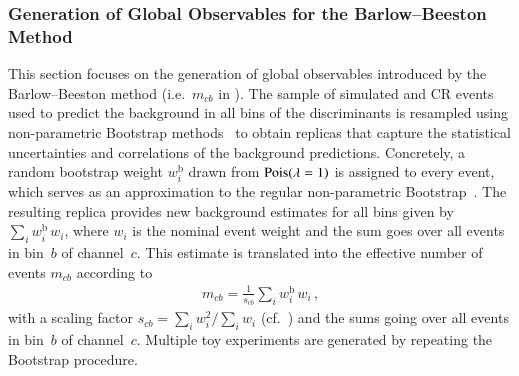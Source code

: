 \subsubsection{Generation of Global Observables for the Barlow--Beeston Method}

This section focuses on the generation of global observables introduced by the
Barlow--Beeston method (i.e.~$m_{cb}$ in
).
%
%
%
The sample of simulated and CR events used to predict the background in all bins
of the discriminants is resampled using non-parametric Bootstrap
methods~\cite{10.1214/aos/1176344552,efron1994introduction} to obtain replicas
that capture the statistical uncertainties and correlations of the background
predictions. Concretely, a random bootstrap weight $w_i^{\text{b}}$ drawn from
$\operatorname{Pois}(\lambda = 1)$ is assigned to every event, which serves as an
approximation to the regular non-parametric
Bootstrap~\cite{google:poisson,ATL-PHYS-PUB-2021-011}. The resulting replica
provides new background estimates for all bins given
by~$\sum_{i} w_{i}^{\text{b}} \, w_i$, where $w_i$ is the nominal event weight
and the sum goes over all events in bin~$b$ of channel~$c$. This estimate is
translated into the effective number of events $m_{cb}$ according to
\begin{align*}
  m_{cb} = \frac{1}{s_{cb}} \sum_{i} w_{i}^{\text{b}} \, w_i \,\text{,}
\end{align*}
with a scaling factor $s_{cb} = \sum_i w_i^2 / \sum_i w_i$
(cf.~) and the sums going over all events in bin~$b$ of
channel~$c$. Multiple toy experiments are generated by repeating the Bootstrap
procedure.

